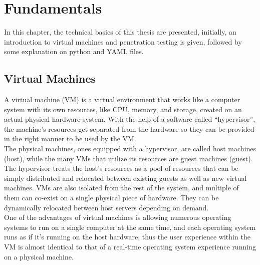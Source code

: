 \chapter{Fundamentals}
In this chapter, the technical basics of this thesis are presented, initially, an introduction to virtual machines and penetration testing is given, followed by some explanation on python and YAML files.

\section{Virtual Machines}
A virtual machine (VM) is a virtual environment that works like a computer system with its own resources, like CPU, memory, and storage, created on an actual physical hardware system. With the help of a software called  “hypervisor”, the machine’s resources get separated from the hardware so they can be provided in the right manner to be used by the VM.\\
The physical machines, ones equipped with a hypervisor, are called host machines (host), while the many VMs that utilize its resources are guest machines (guest). The hypervisor treats the host’s resources as a pool of resources that can be simply distributed and relocated between existing guests as well as new virtual machines. VMs are also isolated from the rest of the system, and multiple of them can co-exist on a single physical piece of hardware. They can be dynamically relocated between host servers depending on demand.\\
One of the advantages of virtual machines is allowing numerous operating systems to run on a single computer at the same time, and each operating system runs as if it’s running on the host hardware, thus the user experience within the VM is almost identical to that of a real-time operating system experience running on a physical machine\cite{vm_redhat}.

